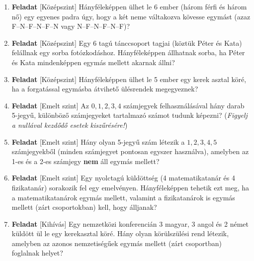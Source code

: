 \documentclass[12pt,a4paper]{article}
\begin{document}
\begin{enumerate}
\begin{enumerate}[leftmargin=*]
    \vspace{0.3cm}

    \item \textbf{Feladat} \textsf{\small [Középszint]}
    Hányféleképpen ülhet le 6 ember (három férfi és három nő) egy egyenes padra úgy, hogy a két neme váltakozva kövesse egymást (azaz F--N--F--N--F--N vagy N--F--N--F--N--F)?

    \vspace{0.3cm}

    \item \textbf{Feladat} \textsf{\small [Középszint]}
    Egy 6 tagú tánccsoport tagjai (köztük Péter és Kata) felállnak egy sorba fotózkodáshoz. Hányféleképpen állhatnak sorba, ha Péter és Kata mindenképpen egymás mellett akarnak állni?

    \vspace{0.3cm}

    \item \textbf{Feladat} \textsf{\small [Középszint]}
    Hányféleképpen ülhet le 5 ember egy kerek asztal köré, ha a forgatással egymásba átvihető ülésrendek megegyeznek?

    \vspace{0.3cm}

    \item \textbf{Feladat} \textsf{\small [Emelt szint]}
    Az $0, 1, 2, 3, 4$ számjegyek felhasználásával hány darab 5-jegyű, különböző számjegyeket tartalmazó számot tudunk képezni? (\emph{Figyelj a nullával kezdődő esetek kiszűrésére!})

    \vspace{0.3cm}

    \item \textbf{Feladat} \textsf{\small [Emelt szint]}
    Hány olyan 5-jegyű szám létezik a $1, 2, 3, 4, 5$ számjegyekből (minden számjegyet pontosan egyszer használva), amelyben az 1-es és a 2-es számjegy \textbf{nem} áll egymás mellett?

    \vspace{0.3cm}

    \item \textbf{Feladat} \textsf{\small [Emelt szint]}
    Egy nyolctagú küldöttség (4 matematikatanár és 4 fizikatanár) sorakozik fel egy emelvényen. Hányféleképpen tehetik ezt meg, ha a matematikatanárok egymás mellett, valamint a fizikatanárok is egymás mellett (zárt csoportokban) kell, hogy álljanak?

    \vspace{0.3cm}

    \item \textbf{Feladat} \textsf{\small [Kihívás]}
    Egy nemzetközi konferencián 3 magyar, 3 angol és 2 német küldött ül le egy kerekasztal köré. Hány olyan körülszülési rend létezik, amelyben az azonos nemzetiségűek egymás mellett (zárt csoportban) foglalnak helyet?

\end{enumerate}

\end{enumerate}
\end{document}
